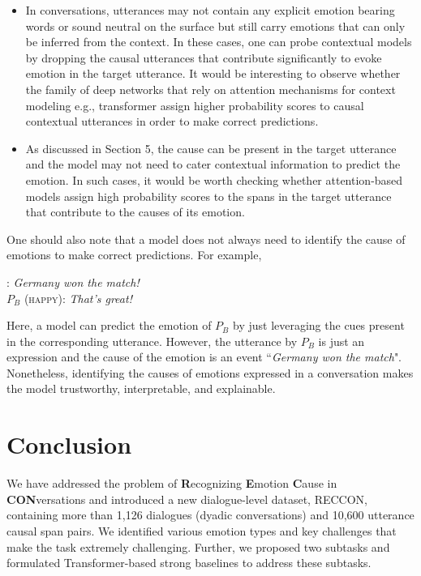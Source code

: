 \documentclass[smallextended]{svjour3}
\newcommand\emo[1]{\textsc{#1}}
\newcommand\RECCONDA{RECCON}
\newcommand\0{\hphantom{0}}
\begin{document}
\begin{itemize}[leftmargin=*]
    \item In conversations, utterances may not contain any explicit emotion bearing words or sound neutral on the surface but still carry emotions that can only be inferred from the context. In these cases, one can probe contextual models by dropping the causal utterances that contribute significantly to evoke emotion in the target utterance. It would be interesting to observe whether the family of deep networks that rely on attention mechanisms for context modeling e.g., transformer assign higher probability scores to causal contextual utterances in order to make correct predictions.
    \item As discussed in Section 5, the cause can be present in the target utterance and the model may not need to cater contextual information to predict the emotion. In such cases, it would be worth checking whether attention-based models assign high probability scores to the spans in the target utterance that contribute to the causes of its emotion. 
\end{itemize}

One should also note that a model does not always need to identify the cause of emotions to make correct predictions. For example, 
\begin{exe}
\ex {$P_A$ (\emo{happy})}: \textit{Germany won the match!}\\
{$P_B$ (\emo{happy})}: \textit{That's great!}
\end{exe}
Here, a model can predict the emotion of $P_B$ by just leveraging the cues present in the corresponding utterance. However, the utterance by $P_B$ is just an expression and the cause of the emotion is an event ``\textit{Germany won the match}". Nonetheless, identifying the causes of emotions expressed in a conversation makes the model trustworthy, interpretable, and explainable. 
























\section{Conclusion}
We have addressed the problem of \textbf{R}ecognizing \textbf{E}motion \textbf{C}ause in \textbf{CON}versations and introduced a new dialogue-level dataset, \RECCONDA{}, 
containing more than 1,126 dialogues (dyadic conversations) and 10,600 utterance causal span pairs. We identified various emotion types and key challenges that make the task 
extremely challenging. Further, we 
proposed two subtasks and formulated Transformer-based strong baselines to address these subtasks.
\end{document}
